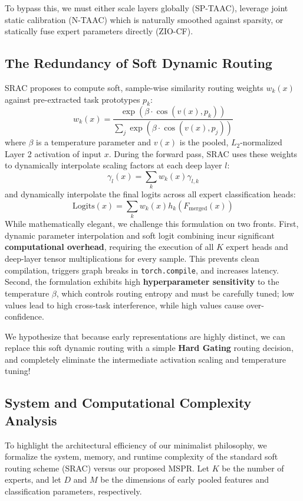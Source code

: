 \documentclass{article}
\theoremstyle{plain}
\theoremstyle{definition}
\theoremstyle{remark}
\begin{document}
To bypass this, we must either scale layers globally (SP-TAAC), leverage joint static calibration (N-TAAC) which is naturally smoothed against sparsity, or statically fuse expert parameters directly (ZIO-CF).

\subsection{The Redundancy of Soft Dynamic Routing}
SRAC proposes to compute soft, sample-wise similarity routing weights $w_k(x)$ against pre-extracted task prototypes $p_k$:
\begin{equation}
w_k(x) = \frac{\exp(\beta \cdot \cos(v(x), p_k))}{\sum_j \exp(\beta \cdot \cos(v(x), p_j))}
\end{equation}
where $\beta$ is a temperature parameter and $v(x)$ is the pooled, $L_2$-normalized Layer 2 activation of input $x$. During the forward pass, SRAC uses these weights to dynamically interpolate scaling factors at each deep layer $l$:
\begin{equation}
\gamma_l(x) = \sum_k w_k(x) \gamma_{l,k}
\end{equation}
and dynamically interpolate the final logits across all expert classification heads:
\begin{equation}
\text{Logits}(x) = \sum_k w_k(x) h_k(F_{\text{merged}}(x))
\end{equation}
While mathematically elegant, we challenge this formulation on two fronts. First, dynamic parameter interpolation and soft logit combining incur significant \textbf{computational overhead}, requiring the execution of all $K$ expert heads and deep-layer tensor multiplications for every sample. This prevents clean compilation, triggers graph breaks in \texttt{torch.compile}, and increases latency. Second, the formulation exhibits high \textbf{hyperparameter sensitivity} to the temperature $\beta$, which controls routing entropy and must be carefully tuned; low values lead to high cross-task interference, while high values cause over-confidence.

We hypothesize that because early representations are highly distinct, we can replace this soft dynamic routing with a simple \textbf{Hard Gating} routing decision, and completely eliminate the intermediate activation scaling and temperature tuning!

\subsection{System and Computational Complexity Analysis}
\label{complexity-analysis}
To highlight the architectural efficiency of our minimalist philosophy, we formalize the system, memory, and runtime complexity of the standard soft routing scheme (SRAC) versus our proposed MSPR. Let $K$ be the number of experts, and let $D$ and $M$ be the dimensions of early pooled features and classification parameters, respectively.
\end{document}
